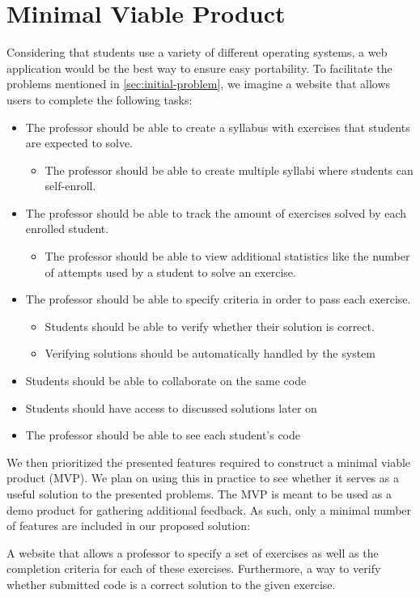 \section{Minimal Viable Product}
Considering that students use a variety of different operating systems, a web application would be the best way to ensure easy portability.
To facilitate the problems mentioned in \ref{sec:initial-problem}, we imagine a website that allows users to complete the following tasks:
\begin{itemize}
	\item The professor should be able to create a syllabus with exercises that students are expected to solve.
	\begin{itemize}
		\item The professor should be able to create multiple syllabi where students can self-enroll.
	\end{itemize}
	\item The professor should be able to track the amount of exercises solved by each enrolled student.
	\begin{itemize}
		\item The professor should be able to view additional statistics like the number of attempts used by a student to solve an exercise.
	\end{itemize}
	\item The professor should be able to specify criteria in order to pass each exercise.
	\begin{itemize}
		\item Students should be able to verify whether their solution is correct.
		\item Verifying solutions should be automatically handled by the system
	\end{itemize}
	\item Students should be able to collaborate on the same code
	\item Students should have access to discussed solutions later on
	\item The professor should be able to see each student's code
\end{itemize}

We then prioritized the presented features required to construct a minimal viable product (MVP).
We plan on using this in practice to see whether it serves as a useful solution to the presented problems. 
The MVP is meant to be used as a demo product for gathering additional feedback.
As such, only a minimal number of features are included in our proposed solution:

\begin{displayquote}
A website that allows a professor to specify a set of exercises as well as the completion criteria for each of these exercises. Furthermore, a way to verify whether submitted code is a correct solution to the given exercise.
\end{displayquote}